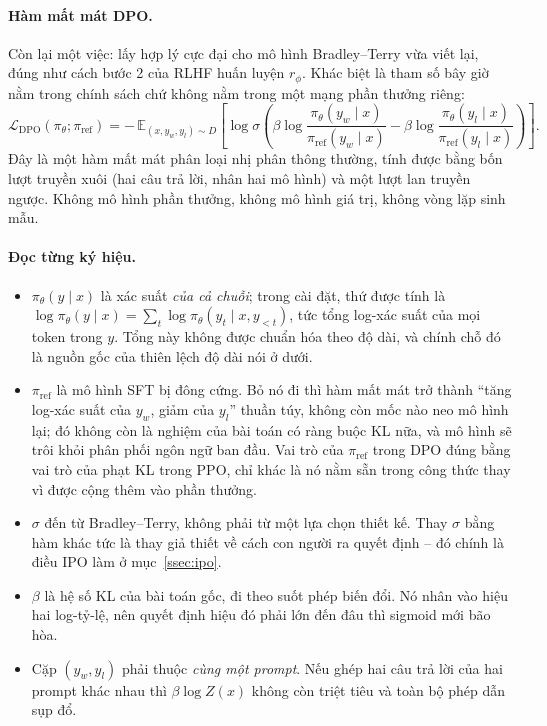 \paragraph{Hàm mất mát DPO.}
Còn lại một việc: lấy hợp lý cực đại cho mô hình Bradley--Terry vừa viết lại, đúng như cách bước 2 của RLHF huấn luyện \( r_{\phi} \). Khác biệt là tham số bây giờ nằm trong chính sách chứ không nằm trong một mạng phần thưởng riêng:
\[
    \mathcal{L}_{\text{DPO}}(\pi_{\theta}; \pi_{\text{ref}})
    = -\,\mathbb{E}_{(x, y_w, y_l) \sim D}
    \left[
        \log \sigma\!\left(
            \beta \log \frac{\pi_{\theta}(y_w \mid x)}{\pi_{\text{ref}}(y_w \mid x)}
            - \beta \log \frac{\pi_{\theta}(y_l \mid x)}{\pi_{\text{ref}}(y_l \mid x)}
        \right)
    \right].
\]
Đây là một hàm mất mát phân loại nhị phân thông thường, tính được bằng bốn lượt truyền xuôi (hai câu trả lời, nhân hai mô hình) và một lượt lan truyền ngược. Không mô hình phần thưởng, không mô hình giá trị, không vòng lặp sinh mẫu.

\paragraph{Đọc từng ký hiệu.}
\begin{itemize}
    \item \( \pi_{\theta}(y \mid x) \) là xác suất \emph{của cả chuỗi}; trong cài đặt, thứ được tính là \( \log \pi_{\theta}(y \mid x) = \sum_t \log \pi_{\theta}(y_t \mid x, y_{<t}) \), tức tổng log-xác suất của mọi token trong \( y \). Tổng này không được chuẩn hóa theo độ dài, và chính chỗ đó là nguồn gốc của thiên lệch độ dài nói ở dưới.
    \item \( \pi_{\text{ref}} \) là mô hình SFT bị đông cứng. Bỏ nó đi thì hàm mất mát trở thành ``tăng log-xác suất của \( y_w \), giảm của \( y_l \)'' thuần túy, không còn mốc nào neo mô hình lại; đó không còn là nghiệm của bài toán có ràng buộc KL nữa, và mô hình sẽ trôi khỏi phân phối ngôn ngữ ban đầu. Vai trò của \( \pi_{\text{ref}} \) trong DPO đúng bằng vai trò của phạt KL trong PPO, chỉ khác là nó nằm sẵn trong công thức thay vì được cộng thêm vào phần thưởng.
    \item \( \sigma \) đến từ Bradley--Terry, không phải từ một lựa chọn thiết kế. Thay \( \sigma \) bằng hàm khác tức là thay giả thiết về cách con người ra quyết định -- đó chính là điều IPO làm ở mục~\ref{ssec:ipo}.
    \item \( \beta \) là hệ số KL của bài toán gốc, đi theo suốt phép biến đổi. Nó nhân vào hiệu hai log-tỷ-lệ, nên quyết định hiệu đó phải lớn đến đâu thì sigmoid mới bão hòa.
    \item Cặp \( (y_w, y_l) \) phải thuộc \emph{cùng một prompt}. Nếu ghép hai câu trả lời của hai prompt khác nhau thì \( \beta\log Z(x) \) không còn triệt tiêu và toàn bộ phép dẫn sụp đổ.
\end{itemize}

